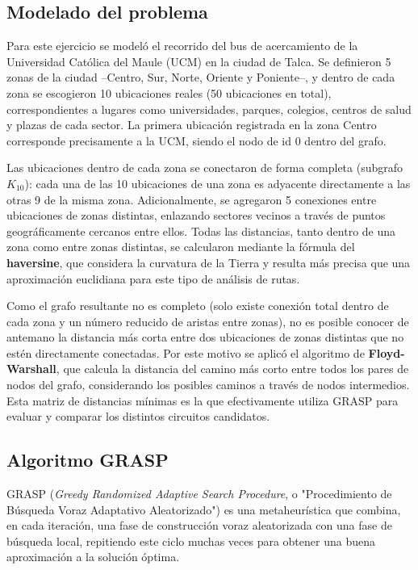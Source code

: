\documentclass[12pt,letterpaper]{article}
\begin{document}
\subsection{Modelado del problema}

Para este ejercicio se modeló el recorrido del bus de acercamiento de la Universidad Católica
del Maule (UCM) en la ciudad de Talca. Se definieron 5 zonas de la ciudad --Centro, Sur, Norte,
Oriente y Poniente--, y dentro de cada zona se escogieron 10 ubicaciones reales (50 ubicaciones
en total), correspondientes a lugares como universidades, parques, colegios, centros de salud y
plazas de cada sector. La primera ubicación registrada en la zona Centro corresponde
precisamente a la UCM, siendo el nodo de id 0 dentro del grafo.

Las ubicaciones dentro de cada zona se conectaron de forma completa (subgrafo $K_{10}$): cada
una de las 10 ubicaciones de una zona es adyacente directamente a las otras 9 de la misma zona.
Adicionalmente, se agregaron 5 conexiones entre ubicaciones de zonas distintas, enlazando
sectores vecinos a través de puntos geográficamente cercanos entre ellos. Todas las distancias,
tanto dentro de una zona como entre zonas distintas, se calcularon mediante la fórmula del
\textbf{haversine}, que considera la curvatura de la Tierra y resulta más precisa que una
aproximación euclidiana para este tipo de análisis de rutas.

Como el grafo resultante no es completo (solo existe conexión total dentro de cada zona y un
número reducido de aristas entre zonas), no es posible conocer de antemano la distancia más
corta entre dos ubicaciones de zonas distintas que no estén directamente conectadas. Por este
motivo se aplicó el algoritmo de \textbf{Floyd-Warshall}, que calcula la distancia del camino
más corto entre todos los pares de nodos del grafo, considerando los posibles caminos a través
de nodos intermedios. Esta matriz de distancias mínimas es la que efectivamente utiliza GRASP
para evaluar y comparar los distintos circuitos candidatos.

\subsection{Algoritmo GRASP}

GRASP (\textit{Greedy Randomized Adaptive Search Procedure}, o "Procedimiento de Búsqueda Voraz
Adaptativo Aleatorizado") es una metaheurística que combina, en cada iteración, una fase de
construcción voraz aleatorizada con una fase de búsqueda local, repitiendo este ciclo muchas
veces para obtener una buena aproximación a la solución óptima.
\end{document}
